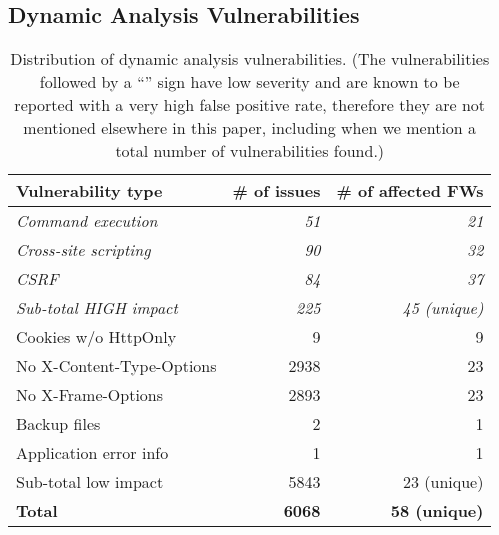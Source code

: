 \documentclass[conference]{./templates/ndss/IEEEtran}
\newcounter{t0d0_counter}
\newcounter{pr00f_counter}
\newcommand{\CountFirmwareDynVulnTotal}{58}
\newcommand{\CountFirmwareDynVulnTotalHigh}{45} \newcommand{\CountFirmwareDynVulnTotalLow}{23} \newcommand{\CountFirmwareDynVulnCmdInj}{21}
\newcommand{\CountFirmwareDynVulnXSS}{32}
\newcommand{\CountFirmwareDynVulnCSRF}{37}
\newcommand{\CountFirmwareDynVulnBackup}{1}
\newcommand{\countfirmwaredynvulncookiehttp}{9}
\newcommand{\countfirmwaredynvulnxcontenttype}{23}
\newcommand{\countfirmwaredynvulnxframeoptions}{23}
\newcommand{\CountFirmwareDynVulnErrorDiscl}{1}
\newcommand{\CountDynVulnsTotal}{6068} \newcommand{\CountDynVulnsTotalHigh}{225}
\newcommand{\CountDynVulnsTotalLow}{5843} \newcommand{\CountDynVulnsCmdInj}{51} \newcommand{\CountDynVulnsXSS}{90}
\newcommand{\CountDynVulnsCSRF}{84}
\newcommand{\CountDynVulnsBackup}{2}
\newcommand{\countdynvulncookiehttp}{9}
\newcommand{\countdynvulnxcontenttype}{2938}
\newcommand{\countdynvulnxframeoptions}{2893}
\newcommand{\CountDynVulnAppErrorDiscl}{1}
\begin{document}
\subsection{Dynamic Analysis Vulnerabilities}



\begin{table}[t]
\centering
\caption{
  Distribution of dynamic analysis vulnerabilities. 
  (The vulnerabilities
  followed by a ``'' sign have low severity and are known to be reported
  with a very high false positive rate, therefore they are not mentioned elsewhere
  in this paper, including when we mention a total number of vulnerabilities found.) 
  }
\begin{tabular}{lrr}\\
\toprule
\textbf{Vulnerability type} & \textbf{\# of issues} & \textbf{\# of affected FWs} \\\midrule

\emph{Command execution}        & \emph{\CountDynVulnsCmdInj{}}     & \emph{\CountFirmwareDynVulnCmdInj{}}   \\\emph{Cross-site scripting}     & \emph{\CountDynVulnsXSS{}}        & \emph{\CountFirmwareDynVulnXSS{}}      \\\emph{CSRF}                     & \emph{\CountDynVulnsCSRF{}}       & \emph{\CountFirmwareDynVulnCSRF{}}     \\

\midrule
\emph{Sub-total HIGH impact}          & \emph{\CountDynVulnsTotalHigh{}}      & \emph{\CountFirmwareDynVulnTotalHigh{} (unique)}  \\\midrule

Cookies w/o HttpOnly            & \countdynvulncookiehttp                    & \countfirmwaredynvulncookiehttp                            \\No X-Content-Type-Options       & \countdynvulnxcontenttype                    & \countfirmwaredynvulnxcontenttype                    \\No X-Frame-Options              & \countdynvulnxframeoptions                    & \countfirmwaredynvulnxframeoptions                      \\Backup files                    & \CountDynVulnsBackup                    & \CountFirmwareDynVulnBackup                      \\Application error info          & \CountDynVulnAppErrorDiscl                    & \CountFirmwareDynVulnErrorDiscl                      \\

\midrule
Sub-total low impact            & \CountDynVulnsTotalLow{}      & \CountFirmwareDynVulnTotalLow{} (unique)  \\\midrule

\textbf{Total}          & \textbf{\CountDynVulnsTotal{}}      & \textbf{\CountFirmwareDynVulnTotal{} (unique)}  \\

\bottomrule
\end{tabular}
\label{tbl:vulns-dynamic}
\end{table}
\end{document}
